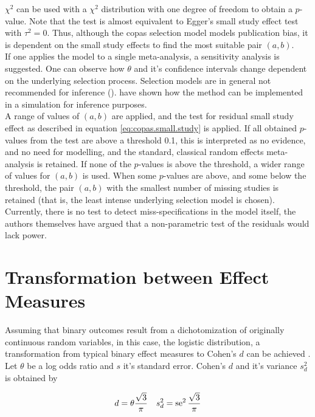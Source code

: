 \documentclass[11pt,a4paper,twoside]{book}\usepackage[]{graphicx}\usepackage[]{color}
\begin{document}
$\chi^2$ can be used with a $\chi^2$ distribution with one degree of freedom to obtain a $p$-value. Note that the test is almost equivalent to Egger's small study effect test with $\tau^2 = 0$. Thus, although the copas selection model models publication bias, it is dependent on the small study effects to find the most suitable pair $(a,b)$. \\
If one applies the model to a single meta-analysis, a sensitivity analysis is suggested. One can observe how $\theta$ and it's confidence intervals change dependent on the underlying selection process. Selection models are in general not recommended for inference (\eg \citet{selection.assessment}). 
\citet{limitmeta} have shown how the method can be implemented in a simulation for inference purposes. \\
A range of values of $(a,b)$ are applied, and the test for residual small study effect as described in equation \ref{eq:copas.small.study} is applied. If all obtained $p$-values from the test are above a threshold 0.1, this is interpreted as no evidence, and no need for modelling, and the standard, classical random effects meta-analysis is retained. If none of the $p$-values is above the threshold, a wider range of values for $(a,b)$ is used. When some $p$-values are above, and some below the threshold, the pair $(a,b)$ with the smallest number of missing studies is retained (that is, the least intense underlying selection model is chosen).\\
Currently, there is no test to detect miss-specifications in the model itself, the authors themselves have argued that a non-parametric test of the residuals would lack power.



\section{Transformation between Effect Measures} \label{sec:transformation.effectsizes}
Assuming that binary outcomes result from a dichotomization of originally continuous random variables, in this case, the logistic distribution, a transformation from typical binary effect measures to Cohen's $d$ can be achieved \cite[47]{Intro.meta}. \\
Let $\theta$ be a log odds ratio and $s$ it's standard error. Cohen's $d$ and it's variance $s_d^2$ is obtained by

\begin{align}
d &= \theta \frac{\sqrt{3}}{\pi} & s_d^2 =  \operatorname{se}^2\frac{\sqrt{3}}{\pi} \nonumber
\end{align}
\end{document}
